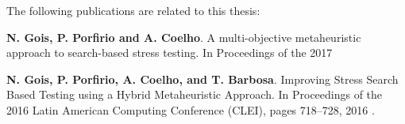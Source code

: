  

The following publications are related to this thesis:

\noindent \textbf{N. Gois, P. Porfirio and A. Coelho}. A multi-objective metaheuristic approach to search-based stress testing. In Proceedings of the 2017

\noindent \textbf{N. Gois, P. Porfirio, A. Coelho, and T. Barbosa}. Improving Stress Search Based Testing using a Hybrid Metaheuristic Approach. In Proceedings of the 2016 Latin American Computing Conference (CLEI), pages 718–728, 2016 \cite{Gois2016}.
